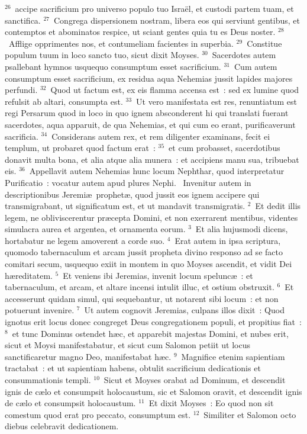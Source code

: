 ${}^{26}$~accipe sacrificium pro universo populo tuo Isra\"el, et custodi partem tuam, et sanctifica.
${}^{27}$~Congrega dispersionem nostram, libera eos qui serviunt gentibus, et contemptos et abominatos respice, ut sciant gentes quia tu es Deus noster.
${}^{28}$~Afflige opprimentes nos, et contumeliam facientes in superbia.
${}^{29}$~Constitue populum tuum in loco sancto tuo, sicut dixit Moyses.
${}^{30}$~Sacerdotes autem psallebant hymnos usquequo consumptum esset sacrificium.
${}^{31}$~Cum autem consumptum esset sacrificium, ex residua aqua Nehemias jussit lapides majores perfundi.
${}^{32}$~Quod ut factum est, ex eis flamma accensa est~: sed ex lumine quod refulsit ab altari, consumpta est.
${}^{33}$~Ut vero manifestata est res, renuntiatum est regi Persarum quod in loco in quo ignem absconderent hi qui translati fuerant sacerdotes, aqua apparuit, de qua Nehemias, et qui cum eo erant, purificaverunt sacrificia.
${}^{34}$~Considerans autem rex, et rem diligenter examinans, fecit ei templum, ut probaret quod factum erat~:
${}^{35}$~et cum probasset, sacerdotibus donavit multa bona, et alia atque alia munera~: et accipiens manu sua, tribuebat eis.
${}^{36}$~Appellavit autem Nehemias hunc locum Nephthar, quod interpretatur Purificatio~: vocatur autem apud plures Nephi.
~Invenitur autem in descriptionibus Jeremi\ae\ prophet\ae , quod jussit eos ignem accipere qui transmigrabant, ut significatum est, et ut mandavit transmigratis.
${}^{2}$~Et dedit illis legem, ne obliviscerentur pr\ae cepta Domini, et non exerrarent mentibus, videntes simulacra aurea et argentea, et ornamenta eorum.
${}^{3}$~Et alia hujusmodi dicens, hortabatur ne legem amoverent a corde suo.
${}^{4}$~Erat autem in ipsa scriptura, quomodo tabernaculum et arcam jussit propheta divino responso ad se facto comitari secum, usquequo exiit in montem in quo Moyses ascendit, et vidit Dei h\ae reditatem.
${}^{5}$~Et veniens ibi Jeremias, invenit locum spelunc\ae~: et tabernaculum, et arcam, et altare incensi intulit illuc, et ostium obstruxit.
${}^{6}$~Et accesserunt quidam simul, qui sequebantur, ut notarent sibi locum~: et non potuerunt invenire.
${}^{7}$~Ut autem cognovit Jeremias, culpans illos dixit~: Quod ignotus erit locus donec congreget Deus congregationem populi, et propitius fiat~:
${}^{8}$~et tunc Dominus ostendet h\ae c, et apparebit majestas Domini, et nubes erit, sicut et Moysi manifestabatur, et sicut cum Salomon petiit ut locus sanctificaretur magno Deo, manifestabat h\ae c.
${}^{9}$~Magnifice etenim sapientiam tractabat~: et ut sapientiam habens, obtulit sacrificium dedicationis et consummationis templi.
${}^{10}$~Sicut et Moyses orabat ad Dominum, et descendit ignis de c\ae lo et consumpsit holocaustum, sic et Salomon oravit, et descendit ignis de c\ae lo et consumpsit holocaustum.
${}^{11}$~Et dixit Moyses~: Eo quod non sit comestum quod erat pro peccato, consumptum est.
${}^{12}$~Similiter et Salomon octo diebus celebravit dedicationem.


